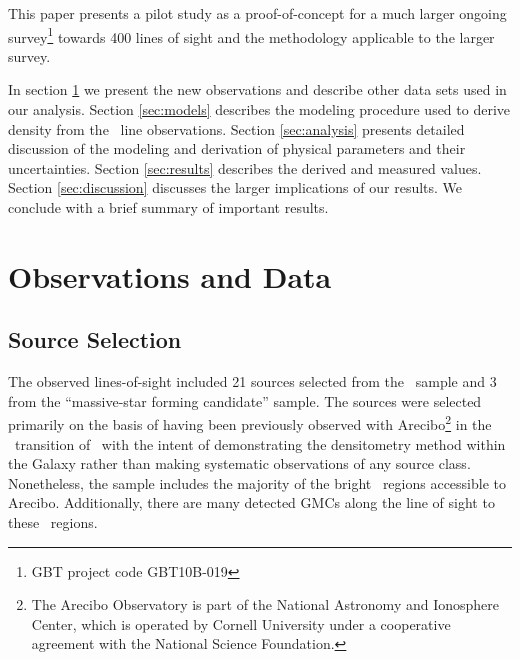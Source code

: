 
This paper presents a pilot study as a proof-of-concept for a much larger
ongoing survey\footnote{GBT project code GBT10B-019} towards 400 lines of sight
and the methodology applicable to the larger survey.

In section \ref{sec:h2coobservations} we present the new observations and describe
other data sets used in our analysis.  Section \ref{sec:models} describes the
modeling procedure used to derive density from the \formaldehyde\ line
observations.  Section \ref{sec:analysis} presents detailed discussion of the
modeling and derivation of physical parameters and their uncertainties.
Section \ref{sec:results} describes the derived and measured values. 
Section \ref{sec:discussion} discusses the larger implications of our results.
We conclude with a brief summary of important results.

\section{Observations and Data}
\label{sec:h2coobservations}
\subsection{Source Selection} 
The observed lines-of-sight included 21 sources selected from the \citet{Araya2002} \uchii\
sample and 3 from the \citet{Araya2004} ``massive-star forming candidate''
sample.  The sources were selected primarily on the basis of having been
previously observed with Arecibo\footnote{The Arecibo Observatory is part of
the National Astronomy and Ionosphere Center, which is operated by Cornell
University under a cooperative agreement with the National Science Foundation.
} in the \oneone\ transition of \formaldehyde\
with the intent of demonstrating the densitometry method within the Galaxy
rather than making systematic observations of any source class.  Nonetheless,
the \citet{Araya2002} sample includes the majority of the bright \uchii\
regions accessible to Arecibo.  Additionally, there are many detected GMCs
along the line of sight to these \uchii\ regions.


